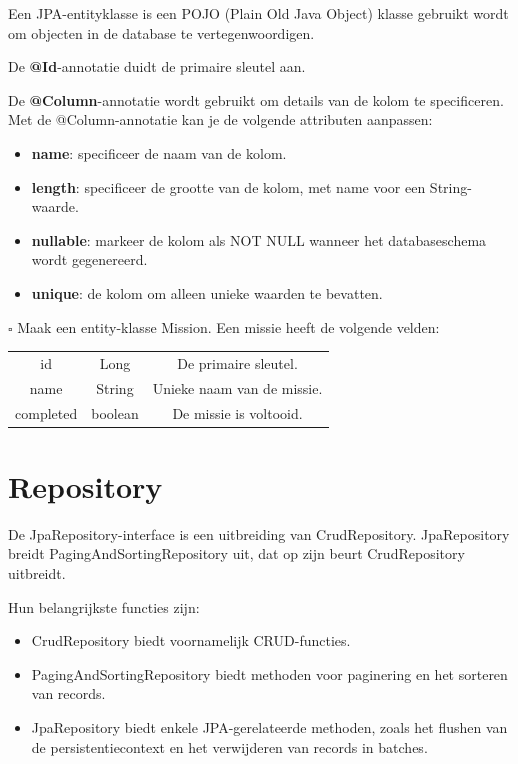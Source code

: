 Een JPA-entityklasse is een POJO (Plain Old Java Object) klasse gebruikt wordt om objecten in de database te vertegenwoordigen.

De \textbf{@Id}-annotatie duidt de primaire sleutel aan.

De \textbf{@Column}-annotatie wordt gebruikt om details van de kolom te specificeren. 
Met de @Column-annotatie kan je de volgende attributen aanpassen:
\begin{itemize}
\item \textbf{name}: specificeer de naam van de kolom.
\item \textbf{length}: specificeer de grootte van de kolom, met name voor een String-waarde.
\item \textbf{nullable}: markeer de kolom als NOT NULL wanneer het databaseschema wordt gegenereerd.
\item \textbf{unique}:  de kolom om alleen unieke waarden te bevatten.
\end{itemize}


\begin{oefening}
$\square$ Maak een entity-klasse Mission.
Een missie heeft de volgende velden:
\begin{tabular}{|c|c|c|}
\hline
id & Long & De primaire sleutel.\\
name & String & Unieke naam van de missie.\\
completed & boolean & De missie is voltooid.\\
\hline
\end{tabular}
\end{oefening}

\section{Repository}

De JpaRepository-interface is een uitbreiding van CrudRepository.
JpaRepository breidt PagingAndSortingRepository uit, dat op zijn beurt CrudRepository uitbreidt.

Hun belangrijkste functies zijn:

\begin{itemize}
\item CrudRepository biedt voornamelijk CRUD-functies.
\item PagingAndSortingRepository biedt methoden voor paginering en het sorteren van records.
\item JpaRepository biedt enkele JPA-gerelateerde methoden, zoals het flushen van de persistentiecontext en het verwijderen van records in batches.
\end{itemize}

